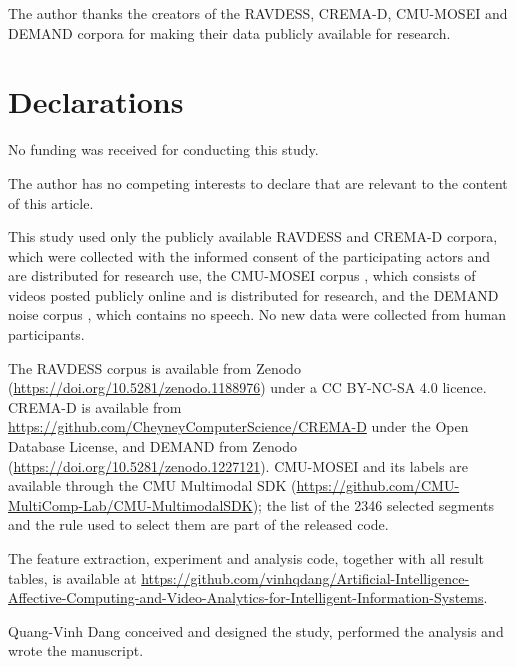 The author thanks the creators of the RAVDESS, CREMA-D, CMU-MOSEI and DEMAND corpora for making their data publicly available for research.

\section*{Declarations}

No funding was received for conducting this study.

The author has no competing interests to declare that are relevant to the content of this article.

This study used only the publicly available RAVDESS \citep{livingstone2018} and CREMA-D \citep{cao2014} corpora, which were collected with the informed consent of the participating actors and are distributed for research use, the CMU-MOSEI corpus \citep{zadeh2018}, which consists of videos posted publicly online and is distributed for research, and the DEMAND noise corpus \citep{thiemann2013}, which contains no speech. No new data were collected from human participants.

The RAVDESS corpus is available from Zenodo (\url{https://doi.org/10.5281/zenodo.1188976}) under a CC BY-NC-SA 4.0 licence. CREMA-D is available from \url{https://github.com/CheyneyComputerScience/CREMA-D} under the Open Database License, and DEMAND from Zenodo (\url{https://doi.org/10.5281/zenodo.1227121}). CMU-MOSEI and its labels are available through the CMU Multimodal SDK (\url{https://github.com/CMU-MultiComp-Lab/CMU-MultimodalSDK}); the list of the 2346 selected segments and the rule used to select them are part of the released code.

The feature extraction, experiment and analysis code, together with all result tables, is available at \url{https://github.com/vinhqdang/Artificial-Intelligence-Affective-Computing-and-Video-Analytics-for-Intelligent-Information-Systems}.

Quang-Vinh Dang conceived and designed the study, performed the analysis and wrote the manuscript.

